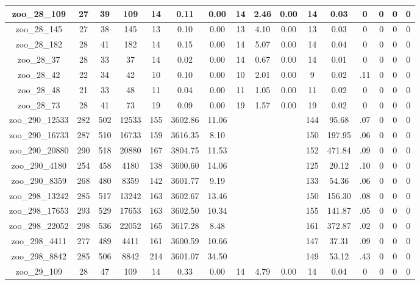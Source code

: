 \begin{landscape}
\begin{longtable}{|c|c|c|c|c|c|c|c|c|c|c|c|c|c|c|c|}
zoo\_28\_109 & 27 & 39 & 109 & 14 & 0.11 & 0.00 & 14 & 2.46 & 0.00 & 14 & 0.03 & 0 & 0 & 0 & 0 \\ \hline 
zoo\_28\_145 & 27 & 38 & 145 & 13 & 0.10 & 0.00 & 13 & 4.10 & 0.00 & 13 & 0.03 & 0 & 0 & 0 & 0 \\ \hline 
zoo\_28\_182 & 28 & 41 & 182 & 14 & 0.15 & 0.00 & 14 & 5.07 & 0.00 & 14 & 0.04 & 0 & 0 & 0 & 0 \\ \hline 
zoo\_28\_37 & 28 & 33 & 37 & 14 & 0.02 & 0.00 & 14 & 0.67 & 0.00 & 14 & 0.01 & 0 & 0 & 0 & 0 \\ \hline 
zoo\_28\_42 & 22 & 34 & 42 & 10 & 0.10 & 0.00 & 10 & 2.01 & 0.00 & 9 & 0.02 & .11 & 0 & 0 & 0 \\ \hline 
zoo\_28\_48 & 21 & 33 & 48 & 11 & 0.04 & 0.00 & 11 & 1.05 & 0.00 & 11 & 0.02 & 0 & 0 & 0 & 0 \\ \hline 
zoo\_28\_73 & 28 & 41 & 73 & 19 & 0.09 & 0.00 & 19 & 1.57 & 0.00 & 19 & 0.02 & 0 & 0 & 0 & 0 \\ \hline 
zoo\_290\_12533 & 282 & 502 & 12533 & 155 & 3602.86 & 11.06 &  &  &  & 144 & 95.68 & .07 & 0 & 0 & 0 \\ \hline 
zoo\_290\_16733 & 287 & 510 & 16733 & 159 & 3616.35 & 8.10 &  &  &  & 150 & 197.95 & .06 & 0 & 0 & 0 \\ \hline 
zoo\_290\_20880 & 290 & 518 & 20880 & 167 & 3804.75 & 11.53 &  &  &  & 152 & 471.84 & .09 & 0 & 0 & 0 \\ \hline 
zoo\_290\_4180 & 254 & 458 & 4180 & 138 & 3600.60 & 14.06 &  &  &  & 125 & 20.12 & .10 & 0 & 0 & 0 \\ \hline 
zoo\_290\_8359 & 268 & 480 & 8359 & 142 & 3601.77 & 9.19 &  &  &  & 133 & 54.36 & .06 & 0 & 0 & 0 \\ \hline 
zoo\_298\_13242 & 285 & 517 & 13242 & 163 & 3602.67 & 13.46 &  &  &  & 150 & 156.30 & .08 & 0 & 0 & 0 \\ \hline 
zoo\_298\_17653 & 293 & 529 & 17653 & 163 & 3602.50 & 10.34 &  &  &  & 155 & 141.87 & .05 & 0 & 0 & 0 \\ \hline 
zoo\_298\_22052 & 298 & 536 & 22052 & 165 & 3617.28 & 8.48 &  &  &  & 161 & 372.87 & .02 & 0 & 0 & 0 \\ \hline 
zoo\_298\_4411 & 277 & 489 & 4411 & 161 & 3600.59 & 10.66 &  &  &  & 147 & 37.31 & .09 & 0 & 0 & 0 \\ \hline 
zoo\_298\_8842 & 285 & 506 & 8842 & 214 & 3601.07 & 34.50 &  &  &  & 149 & 53.12 & .43 & 0 & 0 & 0 \\ \hline 
zoo\_29\_109 & 28 & 47 & 109 & 14 & 0.33 & 0.00 & 14 & 4.79 & 0.00 & 14 & 0.04 & 0 & 0 & 0 & 0 \\ \hline 

\end{longtable}
\end{landscape}

